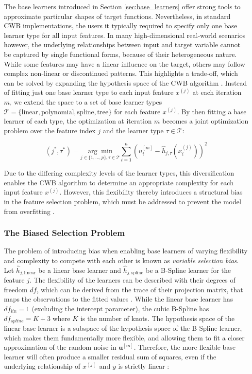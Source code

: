 \documentclass[fontsize=12 pt]{scrartcl}
\begin{document}
The base learners introduced in Section \ref{sec:base_learners} offer strong tools to approximate particular shapes of target functions. Nevertheless, in standard CWB implementations, the users it typically required to specify only one base learner type for all input features. In many high-dimensional real-world scenarios however, the underlying relationships between input and target variable cannot be captured by single functional forms, because of their heterogeneous nature. While some features may have a linear influence on the target, others may follow complex non-linear or discontinued patterns. This highlights a trade-off, which can be solved by expanding the hypothesis space of the CWB algorithm \citep{schmid2008boosting}. Instead of fitting just one base learner type to each input feature ${x^{(j)}}$ at each iteration $m$, we extend the space to a set of base learner types $\mathcal{T} = \{\text{linear}, \text{polynomial}, \text{spline}, \text{tree}\}$ for each feature ${x^{(j)}}$. By then fitting a base learner of each type, the optimization at iteration $m$ becomes a joint optimization problem over the feature index $j$ and the learner type $\tau \in \mathcal{T}$:

\begin{equation}
    (j^*, \tau^*) = \underset{j \in \{1, \dots, p\}, \tau \in \mathcal{T}}{\arg \min} \sum_{i=1}^n \left( u_i^{[m]} - \hat{h}_{j, \tau}(x_i^{(j)}) \right)^2
\end{equation}

Due to the differing complexity levels of the learner types, this diversification enables the CWB algorithm to determine an appropriate complexity for each input feature ${x^{(j)}}$. However, this flexibility thereby introduces a structural bias in the feature selection problem, which must be addressed to prevent the model from overfitting \citep{hofner2014model}.

\subsubsection{The Biased Selection Problem}

The problem of introducing bias when enabling base learners of varying flexibility and complexity to compete with each other is known as \textit{variable selection bias}. Let $\hat{h}_{j, \text{linear}}$ be a linear base learner and $\hat{h}_{j, \text{spline}}$ be a B-Spline learner for the feature $j$. The flexibility of the learners can be described with their degrees of freedom $df$, which can be derived from the trace of their projection matrix, that maps the observations to the fitted values \citep{hofner2011selection}. While the linear base learner has $df_{lin} = 1$ (excluding the intercept parameter), the cubic B-Spline has $df_{spline} = K + 3$ where $K$ is the number of knots. The hypothesis space of the linear base learner is a subspace of the hypothesis space of the B-Spline learner, which makes them fundamentally more flexible, and allowing them to fit a closer approximation of the random noise in $\mathbf{u}^{[m]}$. Therefore, the more flexible base learner will often produce a smaller residual sum of squares, even if the underlying relationship of $x^{(j)}$ and $y$ is strictly linear \citep{hastie2009elements}:
\end{document}
